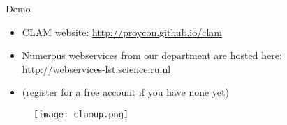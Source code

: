 \documentclass[xcolor=table,10pt,t]{beamer}
\begin{document}
\begin{frame}{Demo}
  \begin{block}{}
      \begin{itemize}
        \item CLAM website: \url{http://proycon.github.io/clam}
      \end{itemize}

      \begin{itemize}
        \item Numerous webservices from our department are hosted here:
          \url{http://webservices-lst.science.ru.nl}
        \item (register for a free account if you have none yet)
      \end{itemize}
      \medskip
        \begin{figure}
          \texttt{[image: clamup.png]}
        \end{figure}
  \end{block}
\end{frame}
\end{document}
